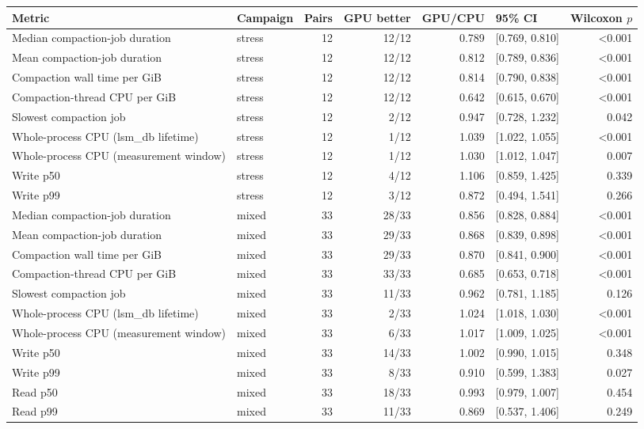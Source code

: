 \begin{tabular}{llrrrlr}
\toprule
Metric & Campaign & Pairs & GPU better & GPU/CPU & 95\% CI & Wilcoxon $p$ \\
\midrule
Median compaction-job duration & stress & 12 & 12/12 & 0.789 & [0.769, 0.810] & <0.001 \\
Mean compaction-job duration & stress & 12 & 12/12 & 0.812 & [0.789, 0.836] & <0.001 \\
Compaction wall time per GiB & stress & 12 & 12/12 & 0.814 & [0.790, 0.838] & <0.001 \\
Compaction-thread CPU per GiB & stress & 12 & 12/12 & 0.642 & [0.615, 0.670] & <0.001 \\
Slowest compaction job & stress & 12 & 2/12 & 0.947 & [0.728, 1.232] & 0.042 \\
Whole-process CPU (lsm_db lifetime) & stress & 12 & 1/12 & 1.039 & [1.022, 1.055] & <0.001 \\
Whole-process CPU (measurement window) & stress & 12 & 1/12 & 1.030 & [1.012, 1.047] & 0.007 \\
Write p50 & stress & 12 & 4/12 & 1.106 & [0.859, 1.425] & 0.339 \\
Write p99 & stress & 12 & 3/12 & 0.872 & [0.494, 1.541] & 0.266 \\
\midrule
Median compaction-job duration & mixed & 33 & 28/33 & 0.856 & [0.828, 0.884] & <0.001 \\
Mean compaction-job duration & mixed & 33 & 29/33 & 0.868 & [0.839, 0.898] & <0.001 \\
Compaction wall time per GiB & mixed & 33 & 29/33 & 0.870 & [0.841, 0.900] & <0.001 \\
Compaction-thread CPU per GiB & mixed & 33 & 33/33 & 0.685 & [0.653, 0.718] & <0.001 \\
Slowest compaction job & mixed & 33 & 11/33 & 0.962 & [0.781, 1.185] & 0.126 \\
Whole-process CPU (lsm_db lifetime) & mixed & 33 & 2/33 & 1.024 & [1.018, 1.030] & <0.001 \\
Whole-process CPU (measurement window) & mixed & 33 & 6/33 & 1.017 & [1.009, 1.025] & <0.001 \\
Write p50 & mixed & 33 & 14/33 & 1.002 & [0.990, 1.015] & 0.348 \\
Write p99 & mixed & 33 & 8/33 & 0.910 & [0.599, 1.383] & 0.027 \\
Read p50 & mixed & 33 & 18/33 & 0.993 & [0.979, 1.007] & 0.454 \\
Read p99 & mixed & 33 & 11/33 & 0.869 & [0.537, 1.406] & 0.249 \\
\bottomrule
\end{tabular}

